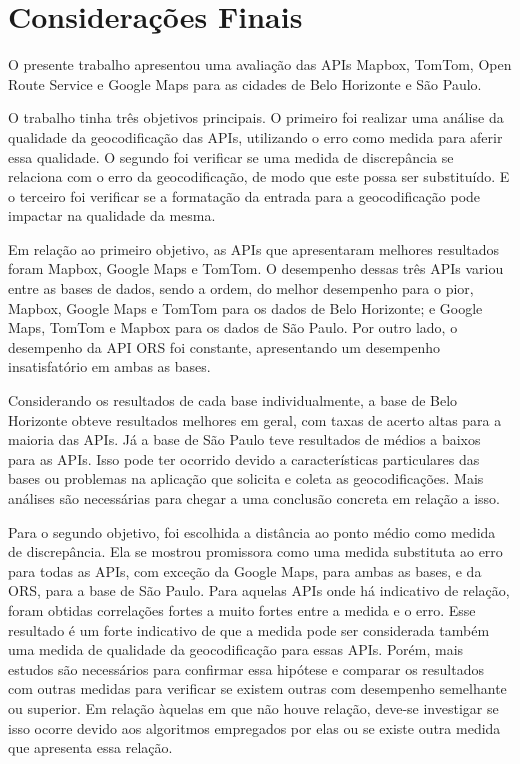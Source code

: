 \chapter{Considerações Finais} \label{consideracoes}

O presente trabalho apresentou uma avaliação das APIs Mapbox, TomTom, Open Route Service e Google Maps para as cidades de Belo Horizonte e São Paulo.

O trabalho tinha três objetivos principais. O primeiro foi realizar uma análise da qualidade da geocodificação das APIs, utilizando o erro como medida para aferir essa qualidade. O segundo foi verificar se uma medida de discrepância se relaciona com o erro da geocodificação, de modo que este possa ser substituído. E o terceiro foi verificar se a formatação da entrada para a geocodificação pode impactar na qualidade da mesma.

Em relação ao primeiro objetivo, as APIs que apresentaram melhores resultados foram Mapbox, Google Maps e TomTom. O desempenho dessas três APIs variou entre as bases de dados, sendo a ordem, do melhor desempenho para o pior, Mapbox, Google Maps e TomTom para os dados de Belo Horizonte; e Google Maps, TomTom e Mapbox para os dados de São Paulo. Por outro lado, o desempenho da API ORS foi constante, apresentando um desempenho insatisfatório em ambas as bases.

Considerando os resultados de cada base individualmente, a base de Belo Horizonte obteve resultados melhores em geral, com taxas de acerto altas para a maioria das APIs. Já a base de São Paulo teve resultados de médios a baixos para as APIs. Isso pode ter ocorrido devido a características particulares das bases ou problemas na aplicação que solicita e coleta as geocodificações. Mais análises são necessárias para chegar a uma conclusão concreta em relação a isso.

Para o segundo objetivo, foi escolhida a distância ao ponto médio como medida de discrepância. Ela se mostrou promissora como uma medida substituta ao erro para todas as APIs, com exceção da Google Maps, para ambas as bases, e da ORS, para a base de São Paulo. Para aquelas APIs onde há indicativo de relação, foram obtidas correlações fortes a muito fortes entre a medida e o erro. Esse resultado é um forte indicativo de que a medida pode ser considerada também uma medida de qualidade da geocodificação para essas APIs. Porém, mais estudos são necessários para confirmar essa hipótese e comparar os resultados com outras medidas para verificar se existem outras com desempenho semelhante ou superior. Em relação àquelas em que não houve relação, deve-se investigar se isso ocorre devido aos algoritmos empregados por elas ou se existe outra medida que apresenta essa relação.

